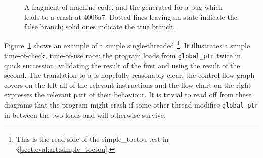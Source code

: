 \begin{figure}
\begin{subfloat}
\begin{minipage}{30mm}
    \end{minipage}
    \caption{\STateMachine}
  \end{subfloat}
  \label{fig:intro:single_threaded_machine}
  \caption{A fragment of machine code, and the {\StateMachine}
    generated for a bug which leads to a crash at 4006a7.  Dotted
    lines leaving an  state indicate the false branch; solid
    ones indicate the true branch.}
\end{figure}

Figure~\ref{fig:intro:single_threaded_machine} shows an example of a
simple single-threaded \StateMachine\footnote{This is the read-side of
  the simple\_toctou test in \S\ref{sect:eval:art:simple_toctou}.}.
It illustrates a simple time-of-check, time-of-use race: the program
loads from \verb|global_ptr| twice in quick succession, validating the
result of the first and using the result of the second.  The
translation to a {\StateMachine} is hopefully reasonably clear: the
control-flow graph covers on the left all of the relevant instructions
and the flow chart on the right expresses the relevant part of their
behaviour.  It is trivial to read off from these diagrams that the
program might crash if some other thread modifies \verb|global_ptr| in
between the two loads and will otherwise survive.


